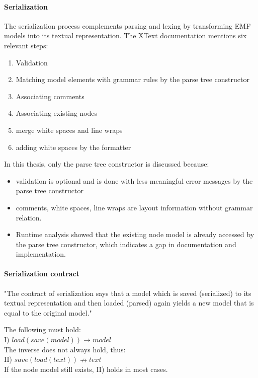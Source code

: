 \paragraph{Serialization}
The serialization process complements parsing and lexing by transforming EMF models into its textual representation. The XText documentation mentions six relevant steps:

\begin{enumerate}
	\item Validation
	\item Matching model elements with grammar rules by the parse tree constructor
	\item Associating comments
	\item Associating existing nodes
	\item merge white spaces and line wraps
	\item adding white spaces by the formatter
\end{enumerate}

In this thesis, only the parse tree constructor is discussed because:
\begin{itemize}
	\item validation is optional and is done with less meaningful error messages by the parse tree constructor
	\item comments, white spaces, line wraps are layout information without grammar relation.
	\item Runtime analysis showed that the existing node model is already accessed by the parse tree constructor, which indicates a gap in documentation and implementation.
\end{itemize}

\paragraph{Serialization contract}
"The contract of serialization says that a model which is saved (serialized) to its textual representation and then loaded (parsed) again yields a new model that is equal to the original model."\cite{XTextMan}

The following must hold:\\
I) $load(save(model)) \rightarrow model$\\
The inverse does not always hold, thus:\\
II) $save(load(text)) \nrightarrow text$\\
If the node model still exists, II) holds in most cases. 

